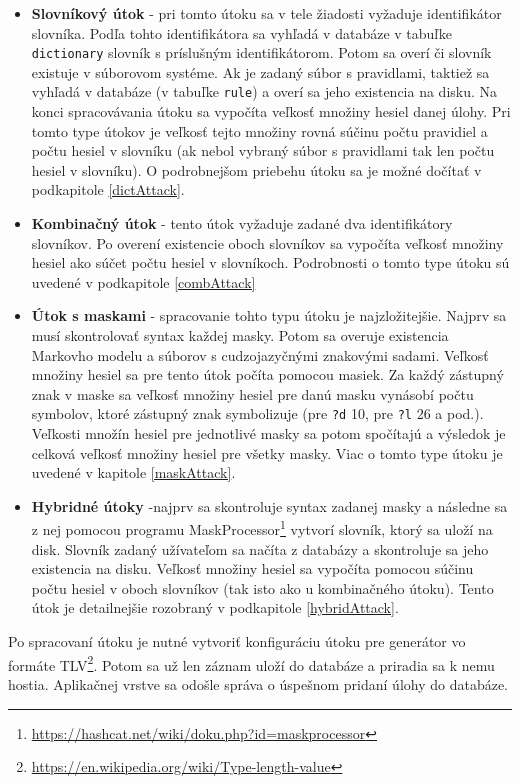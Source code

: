 \documentclass[slovak]{fitthesis}
\begin{document}
\begin{itemize}
    \item \textbf{Slovníkový útok} - pri tomto útoku sa v tele žiadosti vyžaduje identifikátor slovníka. Podľa tohto identifikátora sa vyhľadá v databáze v tabuľke \texttt{dictionary} slovník s príslušným identifikátorom. Potom sa overí či slovník existuje v súborovom systéme. Ak je zadaný súbor s pravidlami, taktiež sa vyhľadá v databáze (v tabuľke \texttt{rule}) a overí sa jeho existencia na disku. Na konci spracovávania útoku sa vypočíta veľkosť množiny hesiel danej úlohy. Pri tomto type útokov je veľkosť tejto množiny rovná súčinu počtu pravidiel a počtu hesiel v slovníku (ak nebol vybraný súbor s pravidlami tak len počtu hesiel v slovníku). O podrobnejšom priebehu útoku sa je možné dočítať v podkapitole \ref{dictAttack}.
    \item \textbf{Kombinačný útok} - tento útok vyžaduje zadané dva identifikátory slovníkov. Po overení existencie oboch slovníkov sa vypočíta veľkosť množiny hesiel ako súčet počtu hesiel v slovníkoch. Podrobnosti o tomto type útoku sú uvedené v podkapitole \ref{combAttack}
    \item \textbf{Útok s maskami} - spracovanie tohto typu útoku je najzložitejšie. Najprv sa musí skontrolovať syntax každej masky. Potom sa overuje existencia Markovho modelu a súborov s cudzojazyčnými znakovými sadami. Veľkosť množiny hesiel sa pre tento útok počíta pomocou masiek. Za každý zástupný znak v maske sa veľkosť množiny hesiel pre danú masku vynásobí počtu symbolov, ktoré zástupný znak symbolizuje (pre \texttt{?d} 10, pre \texttt{?l} 26 a pod.). Veľkosti množín hesiel pre jednotlivé masky sa potom spočítajú a výsledok je celková veľkosť množiny hesiel pre všetky masky. Viac o tomto type útoku je uvedené v kapitole \ref{maskAttack}.
    \item \textbf{Hybridné útoky} -najprv sa skontroluje syntax zadanej masky a následne sa z nej pomocou programu MaskProcessor\footnote{\url{https://hashcat.net/wiki/doku.php?id=maskprocessor}} vytvorí slovník, ktorý sa uloží na disk. Slovník zadaný užívateľom sa načíta z databázy a skontroluje sa jeho existencia na disku. Veľkosť množiny hesiel sa vypočíta pomocou súčinu počtu hesiel v oboch slovníkov (tak isto ako u kombinačného útoku). Tento útok je detailnejšie rozobraný v podkapitole \ref{hybridAttack}.
\end{itemize}
Po spracovaní útoku je nutné vytvoriť konfiguráciu útoku pre generátor vo formáte TLV\footnote{\url{https://en.wikipedia.org/wiki/Type-length-value}}. Potom sa už len záznam uloží do databáze a priradia sa k nemu hostia. Aplikačnej vrstve sa odošle správa o úspešnom pridaní úlohy do databáze.
\end{document}
